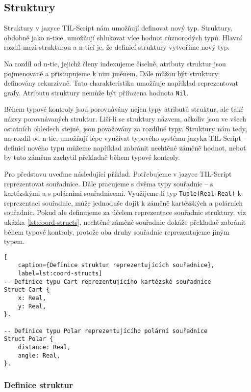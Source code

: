 \subsection{Struktury}\label{structs}

Struktury v jazyce TIL-Script nám umožňují definovat nový typ. Struktury, obdobně jako n-tice,
umožňují shlukovat více hodnot různorodých typů. Hlavní rozdíl mezi strukturou a n-ticí je, že
definicí struktury vytvoříme nový typ.

Na rozdíl od n-tic, jejichž členy indexujeme číselně, atributy struktur jsou pojmenované a
přistupujeme k nim jménem. Dále můžou být struktury definovány rekurzivně. Tato charakteristika
umožňuje například reprezentovat grafy. Atributu struktury nemůže být přiřazena hodnota
\lstinline{Nil}.

Během typové kontroly jsou porovnávány nejen typy atributů struktur, ale také názvy porovnávaných
struktur. Liší-li se struktury názvem, ačkoliv jsou ve všech ostatních ohledech stejné, jsou
považovány za rozdílné typy. Struktury nám tedy, na rozdíl od n-tic, umožňují lépe využívat typového
systému jazyka TIL-Script -- definicí nového typu můžeme například zabránit nechtěné záměně hodnot,
neboť by tuto záměnu zachytil překladač během typové kontroly.

Pro představu uveďme následující příklad. Potřebujeme v jazyce TIL-Script reprezentovat souřadnice.
Dále pracujeme s dvěma typy souřadnic -- s kartézskými a s polárními souřadnicemi. Využijeme-li
typ \lstinline{Tuple(Real Real)} k reprezentaci souřadnic, může jednoduše dojít k záměně
kartézských a polárních souřadnic. Pokud ale definujeme za účelem reprezentace souřadnic struktury,
viz ukázka \ref{lst:coord-structs}, nechtěné záměně souřadnic dokáže překladač zabránit během
typové kontroly, protože oba druhy souřadnic reprezentujeme jiným typem.

\begin{lstlisting}[
    caption={Definice struktur reprezentujících souřadnice},
    label=lst:coord-structs]
-- Definice typu Cart reprezentujícího kartézské souřadnice
Struct Cart {
    x: Real,
    y: Real,
}.

-- Definice typu Polar reprezentujícího polární souřadnice
Struct Polar {
    distance: Real,
    angle: Real,
}.
\end{lstlisting}

\subsubsection{Definice struktur}

